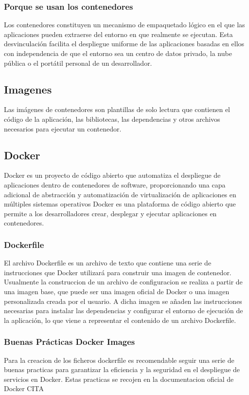 \documentclass[12pt, a4paper, twoside]{article}
\begin{document}
\subsubsection{Porque se usan los contenedores}
Los contenedores constituyen un mecanismo de empaquetado lógico en el que las aplicaciones pueden extraerse del entorno en que realmente se ejecutan. 
Esta desvinculación facilita el despliegue uniforme de las aplicaciones basadas en ellos con independencia de que el entorno sea un centro de datos privado, la nube pública o el portátil personal de un desarrollador.
\subsection{Imagenes}
Las imágenes de contenedores son plantillas de solo lectura que contienen el código de la aplicación, las bibliotecas, las dependencias y otros archivos necesarios para ejecutar un contenedor.
\subsection{Docker}
Docker es un proyecto de código abierto que automatiza el despliegue de aplicaciones dentro de contenedores de software, proporcionando una capa adicional de abstracción y automatización de virtualización de aplicaciones en múltiples sistemas operativos
Docker es una plataforma de código abierto que permite a los desarrolladores crear, desplegar y ejecutar aplicaciones en contenedores. 
\subsubsection{Dockerfile}
El archivo Dockerfile es un archivo de texto que contiene una serie de instrucciones que Docker utilizará para construir una imagen de contenedor.
Usualmente la construccion de un archivo de configuracion se realiza a partir de una imagen base, que puede ser una imagen oficial de Docker o una imagen personalizada creada por el usuario.
A dicha imagen se añaden las instrucciones necesarias para instalar las dependencias y configurar el entorno de ejecución de la aplicación, lo que viene a representar el contenido de un archivo Dockerfile.
\subsubsection{Buenas Prácticas Docker Images}
Para la creacion de los ficheros dockerfile es recomendable seguir una serie de buenas practicas para garantizar la eficiencia y la seguridad en el despliegue de servicios en Docker.
Estas practicas se recojen en la documentacion oficial de Docker CITA
\end{document}
